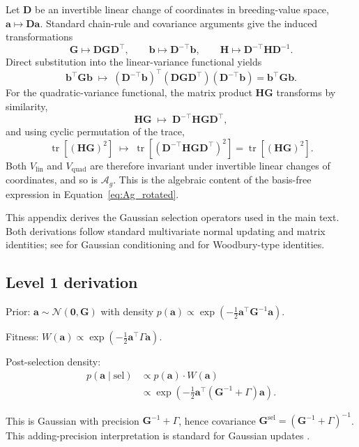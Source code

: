 \documentclass[9pt,twocolumn,twoside,lineno]{gsajnl}
\newcommand{\vect}[1]{\boldsymbol{#1}}
\newcommand{\mat}[1]{\mathbf{#1}}
\newcommand{\tr}{\ensuremath{\operatorname{tr}}\xspace}
\newcommand{\Ag}{\ensuremath{\mathcal{A}_{g}}\xspace}
\newcommand{\Gsel}{\ensuremath{\mat{G}^{\text{sel}}}\xspace}
\newcommand{\Vlin}{\ensuremath{V_{\text{lin}}}\xspace}
\newcommand{\Vquad}{\ensuremath{V_{\text{quad}}}\xspace}
\begin{document}
Let $\mat{D}$ be an invertible linear change of coordinates in breeding-value space, $\vect{a}\mapsto \mat{D}\vect{a}$. Standard chain-rule and covariance arguments give the induced transformations
\[
\mat{G}\mapsto \mat{D}\mat{G}\mat{D}^{\top}, \qquad \vect{b}\mapsto \mat{D}^{-\top}\vect{b}, \qquad \mat{H}\mapsto \mat{D}^{-\top}\mat{H}\mat{D}^{-1}.
\]
Direct substitution into the linear-variance functional yields
\[
\vect{b}^{\top}\mat{G}\vect{b}\;\mapsto\;(\mat{D}^{-\top}\vect{b})^{\top}(\mat{D}\mat{G}\mat{D}^{\top})(\mat{D}^{-\top}\vect{b})
=\vect{b}^{\top}\mat{G}\vect{b}.
\]
For the quadratic-variance functional, the matrix product $\mat{H}\mat{G}$ transforms by similarity,
\[
\mat{H}\mat{G}\;\mapsto\;\mat{D}^{-\top}\mat{H}\mat{G}\mat{D}^{\top},
\]
and using cyclic permutation of the trace,
\[
\tr[(\mat{H}\mat{G})^{2}]\;\mapsto\;\tr\!\left[(\mat{D}^{-\top}\mat{H}\mat{G}\mat{D}^{\top})^{2}\right]=\tr[(\mat{H}\mat{G})^{2}].
\]
Both $\Vlin$ and $\Vquad$ are therefore invariant under invertible linear changes of coordinates, and so is $\Ag$. This is the algebraic content of the basis-free expression in Equation~\eqref{eq:Ag_rotated}.


This appendix derives the Gaussian selection operators used in the main text. Both derivations follow standard multivariate normal updating and matrix identities; see \citet{Anderson2003} for Gaussian conditioning and \citet{GolubVanLoan2013} for Woodbury-type identities.

\subsection{Level 1 derivation}

Prior: $\vect{a} \sim \mathcal{N}(\vect{0}, \mat{G})$ with density $p(\vect{a}) \propto \exp(-\tfrac{1}{2}\vect{a}^\top \mat{G}^{-1} \vect{a})$.

Fitness: $W(\vect{a}) \propto \exp(-\tfrac{1}{2}\vect{a}^\top \Gamma \vect{a})$.

Post-selection density:
\begin{align}
p(\vect{a} \mid \text{sel}) &\propto p(\vect{a}) \cdot W(\vect{a}) \\
&\propto \exp\left(-\tfrac{1}{2}\vect{a}^\top (\mat{G}^{-1} + \Gamma) \vect{a}\right).
\end{align}

This is Gaussian with precision $\mat{G}^{-1} + \Gamma$, hence covariance $\Gsel = (\mat{G}^{-1} + \Gamma)^{-1}$. This adding-precision interpretation is standard for Gaussian updates \citep{Anderson2003}.
\end{document}
